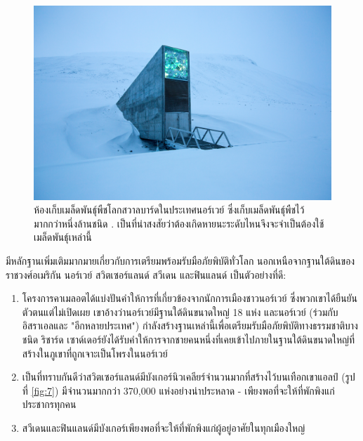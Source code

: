 \documentclass[10pt,twocolumn,letterpaper]{article}
\begin{document}
\begin{figure}[t]
\begin{center}
\includegraphics[width=1\linewidth]{svalbard.jpg}
\end{center}
   \caption{ห้องเก็บเมล็ดพันธุ์พืชโลกสวาลบาร์ดในประเทศนอร์เวย์ ซึ่งเก็บเมล็ดพันธุ์พืชไว้มากกว่าหนึ่งล้านชนิด \cite{24}. เป็นที่น่าสงสัยว่าต้องเกิดหายนะระดับไหนจึงจะจำเป็นต้องใช้เมล็ดพันธุ์เหล่านี้}
\label{fig:8}
\label{fig:onecol}
\end{figure}

มีหลักฐานเพิ่มเติมมากมายเกี่ยวกับการเตรียมพร้อมรับมือภัยพิบัติทั่วโลก นอกเหนือจากฐานใต้ดินของราชวงศ์อเมริกัน นอร์เวย์ สวิตเซอร์แลนด์ สวีเดน และฟินแลนด์ เป็นตัวอย่างที่ดี:

\begin{flushleft}
\begin{enumerate}
    \item โครงการคาเมลอตได้แบ่งปันคำให้การที่เกี่ยวข้องจากนักการเมืองชาวนอร์เวย์ \cite{25,26} ซึ่งพวกเขาได้ยืนยันตัวตนแต่ไม่เปิดเผย เขาอ้างว่านอร์เวย์มีฐานใต้ดินขนาดใหญ่ 18 แห่ง และนอร์เวย์ (ร่วมกับอิสราเอลและ "อีกหลายประเทศ") กำลังสร้างฐานเหล่านี้เพื่อเตรียมรับมือภัยพิบัติทางธรรมชาติบางชนิด ริชาร์ด เซาด์เดอร์ยังได้รับคำให้การจากชายคนหนึ่งที่เคยเข้าไปภายในฐานใต้ดินขนาดใหญ่ที่สร้างในภูเขาที่ถูกเจาะเป็นโพรงในนอร์เวย์ \cite{22}
    \item เป็นที่ทราบกันดีว่าสวิตเซอร์แลนด์มีบังเกอร์นิวเคลียร์จำนวนมากที่สร้างไว้บนเทือกเขาแอลป์ (รูปที่ \ref{fig:7}) มีจำนวนมากกว่า 370,000 แห่งอย่างน่าประหลาด - เพียงพอที่จะให้ที่พักพิงแก่ประชากรทุกคน \cite{27}
    \item สวีเดนและฟินแลนด์มีบังเกอร์เพียงพอที่จะให้ที่พักพิงแก่ผู้อยู่อาศัยในทุกเมืองใหญ่ \cite{27}
\end{enumerate}
\end{flushleft}
\end{document}
